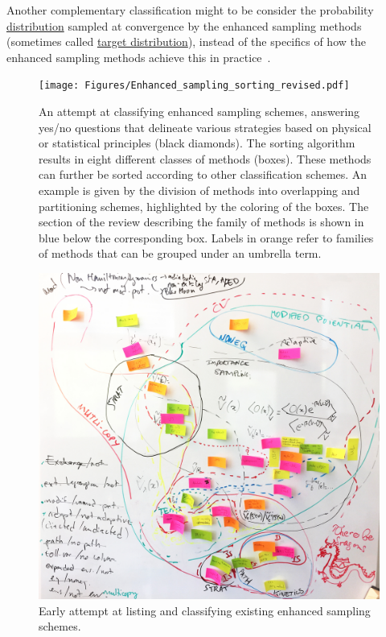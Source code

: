 \documentclass[9pt,review]{livecoms}
\begin{document}
Another complementary classification might to be consider the probability \hyperlink{ref:Distribution} {distribution} sampled at convergence by the enhanced sampling methods (sometimes called \hyperlink{ref:targetdist}{target distribution}), instead of the specifics of how the enhanced sampling methods achieve this in practice~\cite{invernizzi2020unified}.


\begin{figure}[!htb]
\texttt{[image: Figures/Enhanced\_sampling\_sorting\_revised.pdf]}
  \caption{An attempt at classifying enhanced sampling schemes, answering yes/no questions that delineate various strategies based on physical or statistical principles (black diamonds). The sorting algorithm results in eight different classes of methods (boxes). These methods can further be sorted according to other classification schemes. An example is given by the division of methods into overlapping and partitioning schemes, highlighted by the coloring of the boxes. The section of the review describing the family of methods is shown in blue below the corresponding box. Labels in orange refer to families of methods that can be grouped under an umbrella term.}
  \label{fig:scheme}
\end{figure}

\begin{figure}[!htb]
  \includegraphics[width=0.99\columnwidth] {Figures/Venn_Diagram_Early_Attempt.jpeg}
  \caption{Early attempt at listing and classifying existing enhanced sampling schemes.}
  \label{fig:VennD}
\end{figure}
\end{document}

